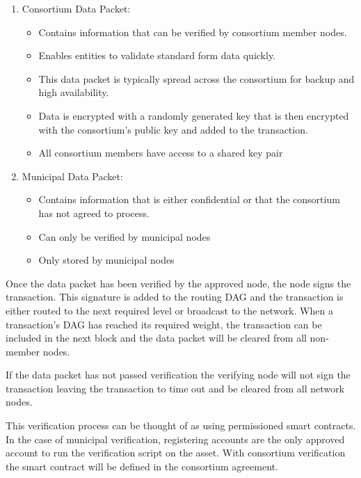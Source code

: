 \documentclass[12pt]{article}
\begin{document}
\begin{enumerate}
	\item Consortium Data Packet:
		\begin{itemize}
			\item{Contains information that can be verified by consortium member
				nodes.}
			\item{Enables entities to validate standard form data quickly.} 
			\item{This data packet is typically spread across the consortium for backup
				and high availability.}
			\item{Data is encrypted with a randomly generated key that is then encrypted
				with the consortium's public key and added to the transaction.}
			\item{All consortium members have access to a shared key pair}	
		\end{itemize}
	\item Municipal Data Packet:
		\begin{itemize}
			\item{Contains information that is either confidential or that the
				consortium has not agreed to process.}
			\item{Can only be verified by municipal nodes}
			\item{Only stored by municipal nodes}
		\end{itemize}
\end{enumerate}

Once the data packet has been verified by the approved node, the node signs the 
transaction. This signature is added to the routing DAG and the transaction is either routed
		to the next required level or broadcast to the network.
When a transaction's DAG has reached 
its required weight, the transaction can be included in the next block and the data
		packet will be cleared from all non-member nodes.

If the data packet has not passed verification the verifying node will not sign the transaction
leaving the transaction to time out and be cleared from all network nodes.

This verification process can be thought of as using permissioned smart contracts.  In the case of municipal
verification, registering accounts are the only approved account to run the verification script on the asset.
With consortium verification the smart contract will be defined in the consortium agreement.
\end{document}
